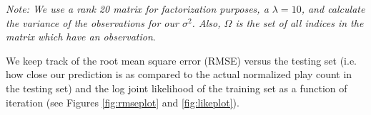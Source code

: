 \documentclass[12pt,preprint]{aastex}
\begin{document}
\emph{Note: We use a rank 20 matrix for factorization purposes, a $\lambda = 10$, and calculate the variance of the observations for our $\sigma^2$. Also, $\Omega$ is the set of all indices in the matrix which have an observation}.

We keep track of the root mean square error (RMSE) versus the testing set (i.e. how close our prediction is as compared to the actual normalized play count in the testing set) and the log joint likelihood of the training set as a function of iteration (see Figures \ref{fig:rmseplot} and \ref{fig:likeplot}).


%


%

\end{document}
